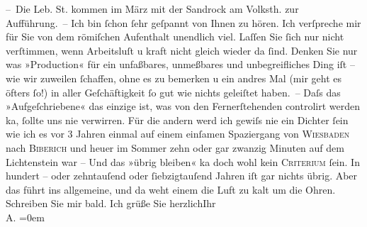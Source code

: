 \begin{ledgroupsized}[t]{13cm}
           \pstart
           – Die Leb. St. kommen im März mit
               der Sandrock am Volksth. zur Aufführung. –\pend
           \pstart
           Ich bin ſchon ſehr geſpannt von Ihnen zu hören. Ich verſpreche mir für Sie von dem
                  römiſchen Aufenthalt unendlich viel. Laſſen
               Sie ſich nur nicht verſtimmen, wenn {\pb}Arbeitsluſt u kraft
               nicht gleich wieder da ſind. Denken Sie nur was »Production« für ein unfaßbares,
               unmeßbares und unbegreifliches Ding iſt – wie wir zuweilen ſchaffen, ohne es zu
               bemerken u ein andres Mal (mir geht es öfters ſo!) in aller Geſchäftigkeit ſo gut wie
               nichts geleiſtet haben. – Daſs das »Aufgeſchriebene« das einzige ist, was von den
               Fernerſtehenden controlirt werden ka{\geminationn}, ſollte uns nie
               verwirren. Für die {\pb}andern werd ich gewiſs nie ein
               Dichter ſein wie ich es vor 3 Jahren einmal auf einem einſamen Spaziergang von \textsc{Wiesbaden} nach \textsc{Biberich} und heuer im Sommer zehn oder gar zwanzig Minuten auf dem Lichtenstein war – Und das »übrig bleiben« ka{\geminationn} doch wohl kein \textsc{Criterium}{ }ſein. In hundert – oder zehntauſend oder
               ſiebzigtauſend Jahren iſt gar nichts {\pb}übrig.\pend
           \pstart
           Aber das führt ins allgemeine, und da weht einem die Luft zu kalt um die Ohren.\pend
           \pstart
           Schreiben Sie mir bald. Ich grüße Sie herzlich\hspace*{1.5em}Ihr{\\[\baselineskip]}\spacefill\mbox{A.}\pend
           \leftskip=0em{}
         
         \endnumbering{}\end{ledgroupsized}  \newcommand{\dateiname}{L01238}\newcommand{\titel}{Arthur Schnitzler an Hugo von Hofmannsthal, 7. 10. 1902}\newcommand{\editorInnen}{ Martin Anton Müller und Gerd-Hermann Susen}
      